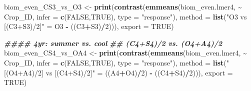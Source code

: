 \documentclass[
]{article}
\newenvironment{Shaded}{\begin{snugshade}}{\end{snugshade}}
\newcommand{\AttributeTok}[1]{\textcolor[rgb]{0.13,0.29,0.53}{#1}}
\newcommand{\ConstantTok}[1]{\textcolor[rgb]{0.56,0.35,0.01}{#1}}
\newcommand{\DecValTok}[1]{\textcolor[rgb]{0.00,0.00,0.81}{#1}}
\newcommand{\DocumentationTok}[1]{\textcolor[rgb]{0.56,0.35,0.01}{\textbf{\textit{#1}}}}
\newcommand{\FunctionTok}[1]{\textcolor[rgb]{0.13,0.29,0.53}{\textbf{#1}}}
\newcommand{\NormalTok}[1]{#1}
\newcommand{\OtherTok}[1]{\textcolor[rgb]{0.56,0.35,0.01}{#1}}
\newcommand{\SpecialCharTok}[1]{\textcolor[rgb]{0.81,0.36,0.00}{\textbf{#1}}}
\newcommand{\StringTok}[1]{\textcolor[rgb]{0.31,0.60,0.02}{#1}}
\begin{document}
\begin{Shaded}
\begin{Highlighting}[]
\NormalTok{biom\_even\_CS3\_vs\_O3 }\OtherTok{\textless{}{-}} \FunctionTok{print}\NormalTok{(}\FunctionTok{contrast}\NormalTok{(}\FunctionTok{emmeans}\NormalTok{(biom\_even.lmer4, }\SpecialCharTok{\textasciitilde{}}\NormalTok{ Crop\_ID, }
                                              \AttributeTok{infer =} \FunctionTok{c}\NormalTok{(}\ConstantTok{FALSE}\NormalTok{,}\ConstantTok{TRUE}\NormalTok{), }
                                              \AttributeTok{type =} \StringTok{"response"}\NormalTok{),}
                                      \AttributeTok{method =} \FunctionTok{list}\NormalTok{(}\StringTok{"O3 vs [(C3+S3)/2]"} \OtherTok{=}\NormalTok{ O3 }\SpecialCharTok{{-}}\NormalTok{ ((C3}\SpecialCharTok{+}\NormalTok{S3)}\SpecialCharTok{/}\DecValTok{2}\NormalTok{))), }
                             \AttributeTok{export =} \ConstantTok{TRUE}\NormalTok{)}

\DocumentationTok{\#\#\#\# 4yr: summer vs. cool}
\DocumentationTok{\#\# (C4+S4)/2 vs. (O4+A4)/2 }
\NormalTok{biom\_even\_CS4\_vs\_OA4 }\OtherTok{\textless{}{-}} \FunctionTok{print}\NormalTok{(}\FunctionTok{contrast}\NormalTok{(}\FunctionTok{emmeans}\NormalTok{(biom\_even.lmer4, }\SpecialCharTok{\textasciitilde{}}\NormalTok{ Crop\_ID,}
                                               \AttributeTok{infer =} \FunctionTok{c}\NormalTok{(}\ConstantTok{FALSE}\NormalTok{,}\ConstantTok{TRUE}\NormalTok{),}
                                               \AttributeTok{type =} \StringTok{"response"}\NormalTok{), }
                                       \AttributeTok{method =} \FunctionTok{list}\NormalTok{(}\StringTok{"[(O4+A4)/2] vs [(C4+S4)/2]"} \OtherTok{=}
\NormalTok{                                                       ((A4}\SpecialCharTok{+}\NormalTok{O4)}\SpecialCharTok{/}\DecValTok{2}\NormalTok{) }\SpecialCharTok{{-}}\NormalTok{ ((C4}\SpecialCharTok{+}\NormalTok{S4)}\SpecialCharTok{/}\DecValTok{2}\NormalTok{))), }
                              \AttributeTok{export =} \ConstantTok{TRUE}\NormalTok{)}


\end{Highlighting}
\end{Shaded}
\end{document}
